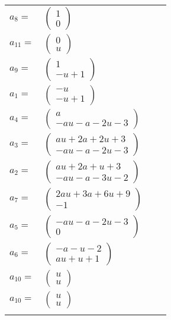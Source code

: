 \documentclass[1p]{elsarticle_modified}
\theoremstyle{definition}
\begin{document}
\begin{tabular}{m{7pt} m{180pt} m{7pt} m{180pt} }
\flushright $a_{8}=$&$\begin{pmatrix}1\\0\end{pmatrix}$ \\
\flushright $a_{11}=$&$\begin{pmatrix}0\\u\end{pmatrix}$ \\
\flushright $a_{9}=$&$\begin{pmatrix}1\\- u+1\end{pmatrix}$ \\
\flushright $a_{1}=$&$\begin{pmatrix}- u\\- u+1\end{pmatrix}$ \\
\flushright $a_{4}=$&$\begin{pmatrix}a\\- a u- a-2 u-3\end{pmatrix}$ \\
\flushright $a_{3}=$&$\begin{pmatrix}a u+2 a+2 u+3\\- a u- a-2 u-3\end{pmatrix}$ \\
\flushright $a_{2}=$&$\begin{pmatrix}a u+2 a+u+3\\- a u- a-3 u-2\end{pmatrix}$ \\
\flushright $a_{7}=$&$\begin{pmatrix}2 a u+3 a+6 u+9\\-1\end{pmatrix}$ \\
\flushright $a_{5}=$&$\begin{pmatrix}- a u- a-2 u-3\\0\end{pmatrix}$ \\
\flushright $a_{6}=$&$\begin{pmatrix}- a- u-2\\a u+u+1\end{pmatrix}$ \\
\flushright $a_{10}=$&$\begin{pmatrix}u\\u\end{pmatrix}$\\ \flushright $a_{10}=$&$\begin{pmatrix}u\\u\end{pmatrix}$\\&\end{tabular}
\end{document}
